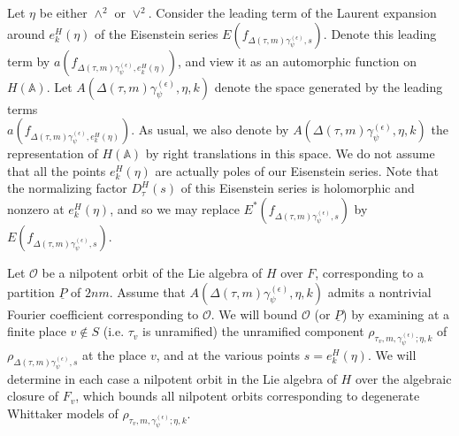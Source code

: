 \documentclass[12pts]{amsart}
\newcommand{\BA}{{\mathbb {A}}}
\begin{document}
Let $\eta$ be either $\wedge^2$ or $\vee^2$. Consider the leading term of the Laurent expansion around $e_k^H(\eta)$ of the Eisenstein series $E(f_{\Delta(\tau,m)\gamma^{(\epsilon)}_\psi,s})$. Denote this leading term by $a(f_{\Delta(\tau,m)\gamma^{(\epsilon)}_\psi,e^H_k(\eta)})$, and view it as an automorphic function on $H(\BA)$. Let $A(\Delta(\tau,m)\gamma_\psi^{(\epsilon)},\eta, k)$ denote the space generated by the leading terms\\ 
$a(f_{\Delta(\tau,m)\gamma^{(\epsilon)}_\psi,e^H_k(\eta)})$. As usual, we also denote by $A(\Delta(\tau,m)\gamma_\psi^{(\epsilon)},\eta, k)$ the representation of $H(\BA)$ by right translations in this space. We do not assume that all the points $e^H_k(\eta)$ are actually poles of our Eisenstein series. Note that the normalizing factor $D_\tau^H(s)$ of this Eisenstein series is holomorphic and nonzero at $e^H_k(\eta)$, and so we may replace $E^*(f_{\Delta(\tau,m)\gamma^{(\epsilon)}_\psi,s})$ by $E(f_{\Delta(\tau,m)\gamma^{(\epsilon)}_\psi,s})$. 

Let $\mathcal{O}$ be a nilpotent orbit of the Lie algebra of $H$ over $F$, corresponding to a partition $\underline{P}$ of $2nm$. Assume that $A(\Delta(\tau,m)\gamma_\psi^{(\epsilon)}, \eta,k)$ admits a nontrivial Fourier coefficient corresponding to $\mathcal{O}$. We will bound $\mathcal{O}$ (or $\underline{P}$) by examining at a finite place $v\notin S$ (i.e. $\tau_v$ is unramified) 
the unramified component $\rho_{\tau_v,m,\gamma_\psi^{(\epsilon)};\eta,k}$ of $\rho_{\Delta(\tau,m)\gamma_\psi^{(\epsilon)},s}$ at the place $v$, and at the various points $s=e^H_k(\eta)$. We will determine in each case a nilpotent orbit in the Lie algebra of $H$ over the algebraic closure of $F_v$, which bounds all nilpotent orbits corresponding to degenerate Whittaker models of $\rho_{\tau_v,m,\gamma_\psi^{(\epsilon)};\eta,k}$.
\end{document}
